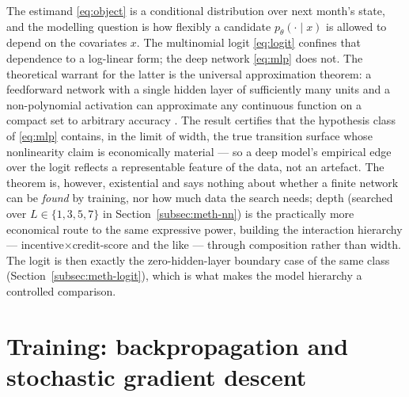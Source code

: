 The estimand \eqref{eq:object} is a conditional distribution over next
month's state, and the modelling question is how flexibly a candidate
$p_\theta(\cdot\mid x)$ is allowed to depend on the covariates $x$. The
multinomial logit \eqref{eq:logit} confines that dependence to a
log-linear form; the deep network \eqref{eq:mlp} does not. The
theoretical warrant for the latter is the universal approximation
theorem: a feedforward network with a single hidden layer of
sufficiently many units and a non-polynomial activation can approximate
any continuous function on a compact set to arbitrary accuracy
\citep{cybenko1989,hornik1991}. The result certifies that the
hypothesis class of \eqref{eq:mlp} contains, in the limit of width, the
true transition surface whose nonlinearity \citet{sirignano2021} claim
is economically material --- so a deep model's empirical edge over the
logit reflects a representable feature of the data, not an artefact.
The theorem is, however, existential and says nothing about whether a
finite network can be \emph{found} by training, nor how much data the
search needs; depth (searched over $L\in\{1,3,5,7\}$ in
Section~\ref{subsec:meth-nn}) is the practically more economical route
to the same expressive power, building the interaction hierarchy ---
incentive$\times$credit-score and the like --- through composition
rather than width. The logit is then exactly the zero-hidden-layer
boundary case of the same class (Section~\ref{subsec:meth-logit}),
which is what makes the model hierarchy a controlled comparison.

\section{Training: backpropagation and stochastic gradient descent}
\label{sec:dlf-sgd}

